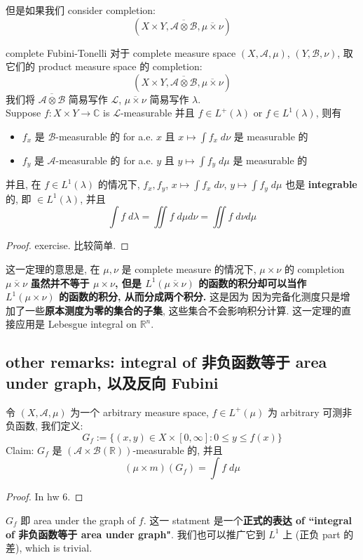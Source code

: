 \documentclass[lang=cn,11pt]{elegantbook}
\begin{document}
但是如果我们 consider completion: \[
(X \times Y , \overline{\mathcal{A} \otimes \mathcal{B}},  \overline{\mu \times \nu}   ) 
\]
\begin{theorem}{complete Fubini-Tonelli}
对于 complete measure space \((X, \mathcal{A}, \mu)\), $ (Y , \mathcal{B}, \nu)$, 取它们的 product measure space 的 completion: \[
(X \times Y , \overline{\mathcal{A} \otimes \mathcal{B}},  \overline{\mu \times \nu}   ) 
\]
我们将 $\overline{\mathcal{A} \otimes \mathcal{B}}$ 简易写作 $\mathcal{L}$, $\overline{\mu \times \nu}   $ 简易写作 $\lambda$.\\
Suppose $f: X \times Y \to \mathbb{C}$ is $\mathcal{L}$-measurable 并且 $f \in L^+(\lambda)$ or $f \in L^1(\lambda)$, 则有
\begin{itemize}
    \item $f_x$ 是 $\mathcal{B}$-measurable 的 for a.e. $x$ 且 $x \mapsto \int f_x \; d\nu$ 是 measurable 的
    \item $f_y$ 是 $\mathcal{A}$-measurable 的 for a.e. $y$ 且 $y \mapsto \int f_y \; d\mu$ 是 measurable 的
\end{itemize}
并且, 在 $f \in L^1(\lambda)$ 的情况下,  $f_x, f_y$, $x \mapsto \int f_x \; d\nu$, $y \mapsto \int f_y \; d\mu$ 也是 \textbf{integrable} 的, 即 $\in L^1(\lambda)$, 并且 \[
\int f \; d\lambda = \iint  f \; d\mu d\nu =  \iint  f \; d\nu d\mu 
\]
\end{theorem}
\begin{proof}
    exercise. 比较简单.
\end{proof}
\begin{remark}
    这一定理的意思是, 在 $\mu,\nu$ 是 complete measure 的情况下, $\mu \times \nu$ 的 completion  $\overline{\mu \times \nu}   $ \textbf{虽然并不等于 $\mu \times \nu$, 但是 $ L^1(\overline{\mu \times \nu})$ 的函数的积分却可以当作 $ L^1(\mu \times \nu)$ 的函数的积分, 从而分成两个积分.}
    这是因为 因为完备化测度只是增加了一些\textbf{原本测度为零的集合的子集}, 这些集合不会影响积分计算. 这一定理的直接应用是 Lebesgue integral on $\mathbb{R}^n$.
\end{remark}

\subsection{other remarks: integral of 非负函数等于 area under graph, 以及反向 Fubini}
\begin{theorem}
    令 $(X,\mathcal{A}, \mu)$ 为一个 arbitrary measure space, $f \in L^+(\mu)$ 为 arbitrary 可测非负函数, 我们定义: \[
    G_f := \{(x,y) \in X \times [0,\infty] : 0 \leq y \leq f(x)\}
    \]
    Claim: $G_f$ 是 $(\mathcal{A}\times \mathcal{B}(\mathbb{R}))$-measurable 的, 并且 \[
    (\mu \times m) (G_f) = \int f \; d\mu
    \]
\end{theorem}
\begin{proof}
    In hw 6.
\end{proof}
\begin{remark}
$G_f$ 即 area under the graph of $f$. 这一 statment 是一个\textbf{正式的表达 of ``integral of 非负函数等于 area under graph"}. 我们也可以推广它到 $L^1$ 上 (正负 part 的差), which is trivial.
\end{remark}
\end{document}
